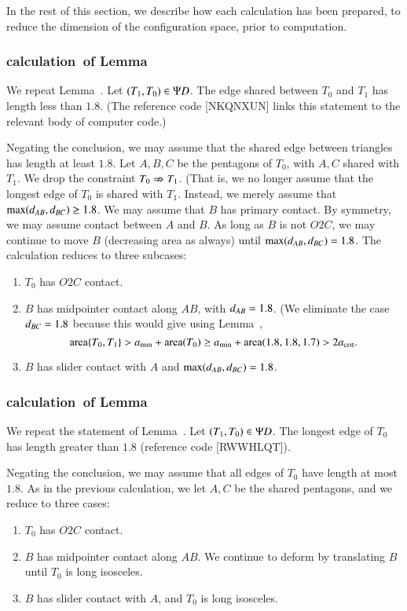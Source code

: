 In the rest of this section, we describe how each calculation has been
prepared, to reduce the dimension of the configuration space, prior to
computation.

\subsubsection{calculation~of Lemma~} 

We repeat Lemma~.  Let $(T_1,T_0)\in \Psi D$.  The edge
shared between $T_0$ and $T_1$ has length less than $1.8$.  (The
reference code [NKQNXUN] links this statement to the relevant body of
computer code.)

Negating the conclusion, we may assume that the shared edge between
triangles has length at least $1.8$.  Let $A,B,C$ be the pentagons of
$T_0$, with $A,C$ shared with $T_1$.  We drop the constraint $T_0\nRightarrow
T_1$.  (That is, we no longer assume that the longest edge of $T_0$ is
shared with $T_1$.  Instead, we merely assume that
$\max(d_{AB},d_{BC})\ge 1.8$.  We may assume that $B$ has primary
contact. By symmetry, we may assume contact between $A$ and $B$.  As
long as $B$ is not $O2C$, we may continue to move $B$ (decreasing area
as always) until $\max(d_{AB},d_{BC})=1.8$.  The calculation reduces
to three subcases:
\begin{enumerate}
\item $T_0$ has $O2C$ contact.
\item $B$ has midpointer contact along $AB$, with $d_{AB}=1.8$.  (We
  eliminate the case $d_{BC}=1.8$ because this would give using
  Lemma~,
\[
{\operatorname{area}}\{T_0,T_1\} > a_\text{min} + {\operatorname{area}}(T_0) \ge a_\text{min} + {\operatorname{area}}(1.8,1.8,1.7) > 2a_\text{crit}.
\]
\item $B$ has slider contact with $A$ and $\max(d_{AB},d_{BC})=1.8$.
\end{enumerate}

\subsubsection{calculation~of Lemma~} 

We repeat the statement of Lemma~.
Let $(T_1,T_0)\in \Psi D$.  The longest edge of $T_0$
has length greater than $1.8$ (reference code [RWWHLQT]).


Negating the conclusion, we may assume that all edges of $T_0$ have
length at most $1.8$.  As in the previous calculation, we let $A,C$ be
the shared pentagons, and we reduce to three cases:
\begin{enumerate}
\item $T_0$ has $O2C$ contact.
\item $B$ has midpointer contact along $AB$.  We continue to deform by
  translating $B$ until $T_0$ is long isosceles.
\item $B$ has slider contact with $A$, and $T_0$ is long isosceles.
\end{enumerate}

